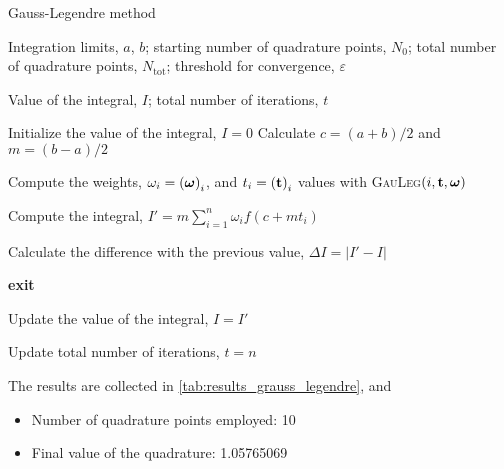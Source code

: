 \begin{algorithm}
    \caption{Gauss-Legendre method}\label{al:gauss_legendre_algorithm}
    \begin{algorithmic}[1]

        \Input Integration limits, $a$, $b$;
        starting number of quadrature points, $N_0$;
        total number of quadrature points, $N_{\text{tot}}$;
        threshold for convergence, $\varepsilon$ 

        \Output Value of the integral, $I$;
        total number of iterations, $t$

        \State Initialize the value of the integral, $I = 0$
        \State Calculate $c = \left( a + b \right) / 2$ and $m = \left( b - a \right) / 2$ 

        \State Compute the weights, $\omega_i = \left( \boldsymbol{\mathrm{\omega}} \right)_i$,
        and $t_i = \left( \boldsymbol{\mathrm{t}} \right)_{i}$ values with
            \textsc{GauLeg}$\left( i, \boldsymbol{\mathrm{t}}, \boldsymbol{\mathrm{\omega}} \right)$

            \State Compute the integral, 
            $I' = m \sum_{i = 1}^{n} \omega_i f\left( c + m t_i \right)$

            \State Calculate the difference with the previous value,
            $\Delta I = \left| I' - I \right|$

                \textbf{exit}
            \EndIf

            \State Update the value of the integral, $I = I'$ 

            \State Update total number of iterations, $t = n$
        \EndFor

        \EndProcedure
    \end{algorithmic}
\end{algorithm}

The results are collected in \cref{tab:results_grauss_legendre}, and
\begin{itemize}
    \item Number of quadrature points employed: 10
    \item Final value of the quadrature: 1.05765069
\end{itemize}

